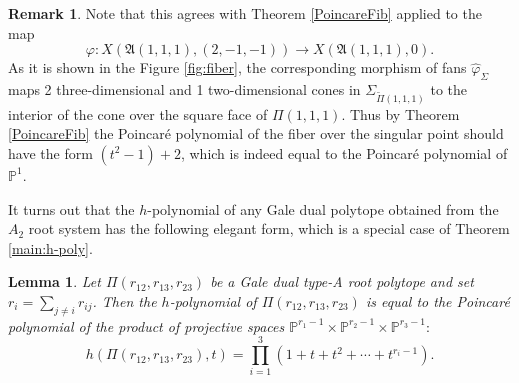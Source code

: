 \documentclass[11pt]{article}
\newtheorem{lemma}[theo]{Lemma}
\theoremstyle{definition}
\newtheorem{rema}[theo]{Remark}
\numberwithin{equation}{section}
\newcommand{\A}{\mathfrak{A}}
\begin{document}
\begin{rema}
Note that this agrees with Theorem \ref{PoincareFib} applied to the map 
$$\varphi: X(\A(1,1,1),(2,-1,-1)) \to X(\A(1,1,1), 0).$$ As it is shown in the 
Figure \ref{fig:fiber}, the corresponding morphism of fans 
$\widehat{\varphi}_\Sigma$ maps 2 three-dimensional and 1 two-dimensional cones 
in $\Sigma_{\widetilde{\Pi}(1,1,1)}$  to the interior of the cone over the 
square face of $\Pi(1,1,1)$. Thus by Theorem \ref{PoincareFib}  the Poincar\'e 
polynomial of the fiber over the singular point should have the form 
$(t^2-1)+2$, which is indeed equal to the Poincar\'e polynomial of 
$\mathbb{P}^1$.
\end{rema}


It turns out that the $h$-polynomial of any Gale dual polytope obtained from 
the $A_2$  root system has the following elegant form, which is a special case 
of Theorem \ref{main:h-poly}.

\begin{lemma}\label{hpoly3} Let $\Pi(r_{12},r_{13},r_{23})$ be a Gale dual type-A root polytope and set $r_i=\sum_{j\neq i} r_{ij}$. Then the $h$-polynomial of $\Pi(r_{12},r_{13},r_{23})$  is equal to the Poincar\'e polynomial of the product of projective spaces $\mathbb{P}^{r_1-1}\times \mathbb{P}^{r_2-1}\times \mathbb{P}^{r_3-1}:$
$$h(\Pi(r_{12},r_{13},r_{23}), t) = \prod_{i=1}^3(1+t+t^2+ \cdots +t^{r_i-1}).$$ 
\end{lemma}
\end{document}

